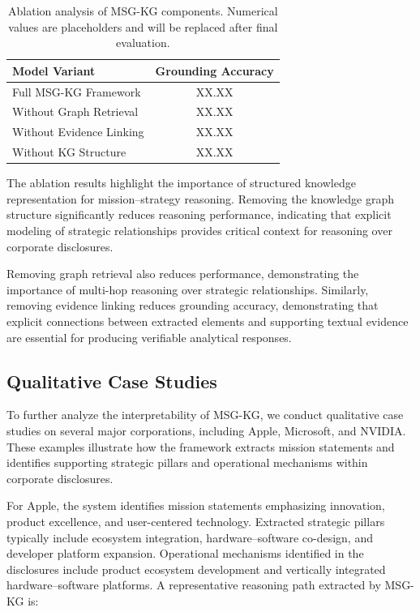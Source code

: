 \documentclass[11pt]{article}
\begin{document}
\begin{table}[h]
\centering
\caption{Ablation analysis of MSG-KG components. Numerical values are placeholders and will be replaced after final evaluation.}
\label{tab:ablation}
\begin{tabular}{lc}
\hline
Model Variant & Grounding Accuracy \\
\hline
Full MSG-KG Framework & XX.XX \\
Without Graph Retrieval & XX.XX \\
Without Evidence Linking & XX.XX \\
Without KG Structure & XX.XX \\
\hline
\end{tabular}

\end{table}

The ablation results highlight the importance of structured knowledge representation for mission--strategy reasoning. Removing the knowledge graph structure significantly reduces reasoning performance, indicating that explicit modeling of strategic relationships provides critical context for reasoning over corporate disclosures.

Removing graph retrieval also reduces performance, demonstrating the importance of multi-hop reasoning over strategic relationships. Similarly, removing evidence linking reduces grounding accuracy, demonstrating that explicit connections between extracted elements and supporting textual evidence are essential for producing verifiable analytical responses.

\subsection{Qualitative Case Studies}

To further analyze the interpretability of MSG-KG, we conduct qualitative case studies on several major corporations, including Apple, Microsoft, and NVIDIA. These examples illustrate how the framework extracts mission statements and identifies supporting strategic pillars and operational mechanisms within corporate disclosures.

For Apple, the system identifies mission statements emphasizing innovation, product excellence, and user-centered technology. Extracted strategic pillars typically include ecosystem integration, hardware–software co-design, and developer platform expansion. Operational mechanisms identified in the disclosures include product ecosystem development and vertically integrated hardware–software platforms. A representative reasoning path extracted by MSG-KG is:
\end{document}
